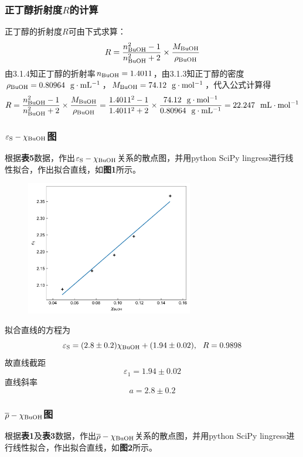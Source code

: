 \documentclass[12pt]{article}
\begin{document}
\subsubsection{正丁醇折射度$R$的计算}
正丁醇的折射度$R$可由下式求算：
$$
R=\frac{n_{\rm BuOH}^{2}-1}{n_{\rm BuOH}^{2}+2}\times \frac{M_{\rm BuOH}}{\rho_{\rm BuOH}}
$$
由3.1.4知正丁醇的折射率$n_{\rm BuOH}=1.4011$，由3.1.3知正丁醇的密度$\rho_{\rm BuOH}=0.80964\ \ {\rm g\cdot mL^{-1}}$，$M_{\rm BuOH}=74.12\ \ {\rm g\cdot mol^{-1}}$，代入公式计算得
$$
R=\frac{n_{\rm BuOH}^{2}-1}{n_{\rm BuOH}^{2}+2}\times \frac{M_{\rm BuOH}}{\rho_{\rm BuOH}}=\frac{1.4011^{2}-1}{1.4011^{2}+2}\times \frac{74.12\ \ {\rm g\cdot mol^{-1}}}{0.80964\ \ {\rm g\cdot mL^{-1}}}=22.247\ \ {\rm mL\cdot mol^{-1}}
$$
\subsubsection{$\varepsilon_{\rm S}-\chi_{\rm BuOH}$图}
根据\textbf{表5}数据，作出$\varepsilon_{\rm S}-\chi_{\rm BuOH}$关系的散点图，并用python SciPy lingress进行线性拟合，作出拟合直线，如\textbf{图1}所示。

\begin{figure}[h]
	\centering
	\includegraphics[width=0.65\textwidth]{1.jpg}
\end{figure}
\par

拟合直线的方程为
$$
\varepsilon_{\rm S}=(2.8\pm 0.2)\chi_{\rm BuOH}+(1.94\pm 0.02),\  \ R=0.9898
$$
故直线截距
$$\varepsilon_{1}=1.94\pm 0.02$$
直线斜率
$$a=2.8\pm 0.2$$

\subsubsection{$\overline{\rho}-\chi_{\rm BuOH}$图}
根据\textbf{表1}及\textbf{表3}数据，作出$\overline{\rho}-\chi_{\rm BuOH}$关系的散点图，并用python SciPy lingress进行线性拟合，作出拟合直线，如\textbf{图2}所示。
\end{document}
